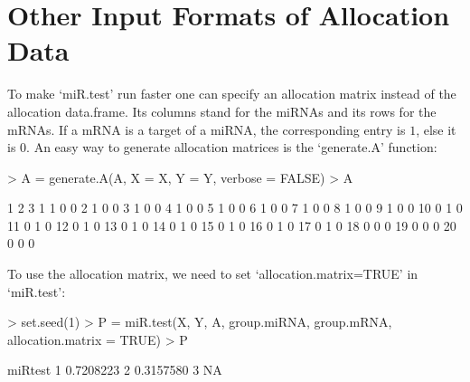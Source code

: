 \documentclass[12pt]{article}
\begin{document}
\section{Other Input Formats of Allocation Data}
To make `miR.test' run faster one can specify an allocation matrix instead of the allocation data.frame. Its columns stand for the miRNAs and its rows for the mRNAs. If a mRNA is a target of a miRNA, the corresponding entry is $1$, else it is $0$. An easy way to generate allocation matrices is the `generate.A' function:
\begin{Schunk}
\begin{Sinput}
> A = generate.A(A, X = X, Y = Y, verbose = FALSE)
> A
\end{Sinput}
\begin{Soutput}
   1 2 3
1  1 0 0
2  1 0 0
3  1 0 0
4  1 0 0
5  1 0 0
6  1 0 0
7  1 0 0
8  1 0 0
9  1 0 0
10 0 1 0
11 0 1 0
12 0 1 0
13 0 1 0
14 0 1 0
15 0 1 0
16 0 1 0
17 0 1 0
18 0 0 0
19 0 0 0
20 0 0 0
\end{Soutput}
\end{Schunk}
To use the allocation matrix, we need to set `allocation.matrix=TRUE' in `miR.test':
\begin{Schunk}
\begin{Sinput}
> set.seed(1)
> P = miR.test(X, Y, A, group.miRNA, group.mRNA, allocation.matrix = TRUE)
> P
\end{Sinput}
\begin{Soutput}
    miRtest
1 0.7208223
2 0.3157580
3        NA
\end{Soutput}
\end{Schunk}

\pagebreak
\end{document}
